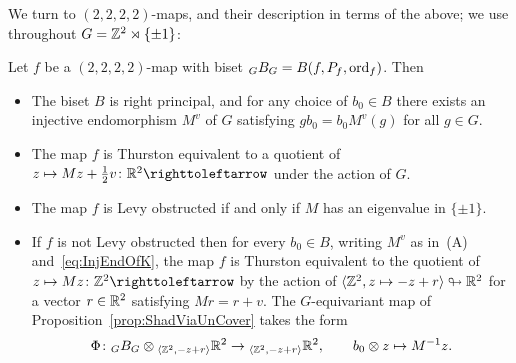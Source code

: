 \documentclass{amsart}
\begin{document}
\noindent We turn to $(2,2,2,2)$-maps, and their description in terms
of the above; we use throughout $G={\mathbb Z}^2\rtimes\{\pm1\}$:
\begin{prop}\label{prop:EndOfG2}
  Let $f$ be a $(2,2,2,2)$-map with biset
  $\subscript G B_G=B(f,P_f,\ord_f)$. Then
  \begin{itemize}
  \item[(A)] The biset $B$ is right principal, and for any choice of
    $b_0\in B$ there exists an injective endomorphism $M^v$ of
    $G$ satisfying $g b_0= b_0 M^v(g)$ for all $g\in G$.
  \item[(B)] The map $f$ is Thurston equivalent to a quotient
    of $z\mapsto M z+\tfrac12v\colon\R^2\selfmap$ under the action of
    $G$.
  \item[(C)] The map $f$ is Levy obstructed if and only if $M$ has an
    eigenvalue in $\{\pm 1\}$.
  \item[(D)] If $f$ is not Levy obstructed then for every $b_0\in B$,
    writing $M^v$ as in~(A) and~\eqref{eq:InjEndOfK}, the map $f$ is
    Thurston equivalent to the quotient of
    $z\mapsto M z\colon\Z^2\selfmap$ by the action of
    $\langle {\mathbb Z}^2, z\mapsto -z+r \rangle \looparrowright {\mathbb R}^2$ for a
    vector $r\in{\mathbb R}^2$ satisfying $M r=r+v$.  The $G$-equivariant map
    of Proposition~\ref{prop:ShadViaUnCover} takes the form
    \begin{equation}\label{eq:GEquivMap}
      \Phi\colon\subscript G B_G\otimes  \subscript{\langle \Z^2,-z+r \rangle}{\R^2}\to\subscript{\langle \Z^2,-z+r \rangle}{\R^2},\qquad b_0\otimes z\mapsto M^{-1}z.
    \end{equation}
  \end{itemize}
\end{prop}
\end{document}

